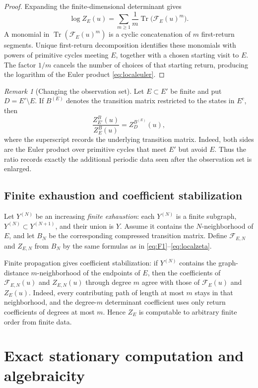 \documentclass[11pt,reqno]{amsart}
\numberwithin{equation}{section}
\theoremstyle{definition}
\theoremstyle{remark}
\newtheorem{remark}[theorem]{Remark}
\newcommand{\Tr}{\operatorname{Tr}}
\newcommand{\cF}{\mathcal F}
\begin{document}
\begin{proof}
Expanding the finite-dimensional determinant gives
\[
 \log Z_E(u)=\sum_{m\ge1}\frac1m\Tr\bigl(\cF_E(u)^m\bigr).
\]
A monomial in $\Tr(\cF_E(u)^m)$ is a cyclic concatenation of $m$
first-return segments.  Unique first-return decomposition identifies these
monomials with powers of primitive cycles meeting $E$, together with a chosen
starting visit to $E$.  The factor $1/m$ cancels the number of choices of that
starting return, producing the logarithm of the Euler product
\eqref{eq:localeuler}.
\end{proof}

\begin{remark}[Changing the observation set]
Let $E\subset E'$ be finite and put $D=E'\setminus E$.  If
$B^{(E)}$ denotes the transition matrix restricted to the states in $E^c$,
then
\[
 \frac{Z_{E'}^B(u)}{Z_E^B(u)}=Z_D^{B^{(E)}}(u),
\]
where the superscript records the underlying transition matrix.  Indeed, both
sides are the Euler product over primitive cycles that meet $E'$ but avoid
$E$.  Thus the ratio records exactly the additional periodic data seen after
the observation set is enlarged.
\end{remark}

\subsection{Finite exhaustion and coefficient stabilization}

Let $Y^{(N)}$ be an increasing \emph{finite exhaustion}: each $Y^{(N)}$ is a
finite subgraph, $Y^{(N)}\subset Y^{(N+1)}$, and their union is $Y$.  Assume it
contains the $N$-neighborhood of $E$, and let $B_N$ be the corresponding
compressed transition matrix.  Define $\cF_{E,N}$ and $Z_{E,N}$ from $B_N$ by
the same formulas as in \eqref{eq:F1}--\eqref{eq:localzeta}.

Finite propagation gives coefficient stabilization: if $Y^{(N)}$ contains the
graph-distance $m$-neighborhood of the endpoints of $E$, then the coefficients
of $\cF_{E,N}(u)$ and $Z_{E,N}(u)$ through degree $m$ agree with those of
$\cF_E(u)$ and $Z_E(u)$.  Indeed, every contributing path of length at most
$m$ stays in that neighborhood, and the degree-$m$ determinant coefficient
uses only return coefficients of degrees at most $m$.  Hence $Z_E$ is
computable to arbitrary finite order from finite data.

\section{Exact stationary computation and algebraicity}
\label{sec:explicit}
\end{document}
